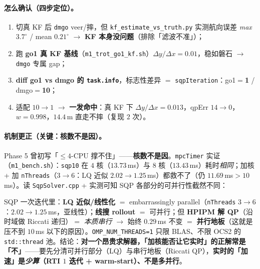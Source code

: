 \paragraph{怎么确认（四步定位）。}
\begin{enumerate}
  \item 切真 KF 后 \texttt{dmgo} veer/摔，但 \texttt{kf\_estimate\_vs\_truth.\allowbreak py} 实测航向误差 \emph{max} $3.7^\circ$ / mean $0.21^\circ$ $\to$ \textbf{KF 本身没问题}（排除「滤波不准」）；
  \item 跑 \textbf{go1 真 KF 基线}（\texttt{m1\_trot\_go1\_kf.\allowbreak sh}）$\Delta y/\Delta x{=}0.01$，稳如磐石 $\to$ \texttt{dmgo} 专属 gap；
  \item \textbf{diff go1 vs dmgo 的 \texttt{task.info}}，标志性差异 $=$ \texttt{sqpIteration}：go1$=$\textbf{1} / dmgo$=$\textbf{10}；
  \item 适配 $10\to1$ $\to$ \textbf{一发命中}：真 KF 下 $\Delta y/\Delta x{=}0.013$，qpErr $14\to0$，$w{=}0.998$，$14.4$\,m 直走不摔（复现 $2$ 次）。
\end{enumerate}

\paragraph{机制更正（关键：核数不是因）。}
Phase 5 曾初写「$\le4$-CPU 撑不住」——\textbf{核数不是因}。\texttt{mpcTimer} 实证（\texttt{m1\_bench.\allowbreak sh}）：\texttt{sqp10} 在 $4$ 核（$13.73$\,ms）与 $8$ 核（$13.43$\,ms）耗时\emph{相同}；加核 + 加 \texttt{nThreads}（$3\to6$：LQ 近似 $2.02\to1.25$\,ms）都救不了（仍 $11.69$\,ms$>10$\,ms）。读 \texttt{SqpSolver.\allowbreak cpp} + 实测可知 SQP 各部分的可并行性截然不同：

\begin{insight}\label{ins:qadv-parallel-floor}
SQP 一次迭代里：\textbf{LQ 近似/线性化} $=$ embarrassingly parallel（\texttt{nThreads} $3\to6$：$2.02\to1.25$\,ms，亚线性）；\textbf{线搜 rollout} $=$ 可并行；但 \textbf{HPIPM 解 QP}（沿时域做 Riccati 递归）$=$ \emph{本质串行} $\to$ 始终 $0.29$\,ms 不变 $=$ \textbf{并行地板}（这就是压不到 $10$\,ms 以下的原因）。\texttt{OMP\_NUM\_THREADS=1} 只限 BLAS、不限 OCS2 的 \texttt{std::thread} 池。结论：\textbf{对一个昂贵求解器，「加核能否让它实时」的正解常是「不」}——要先分清可并行部分（LQ）与串行地板（Riccati QP），\textbf{实时的「加速」是\emph{少算}（RTI $1$ 迭代 + warm-start）、不是多并行}\cite{frison2020hpipm}。
\end{insight}

